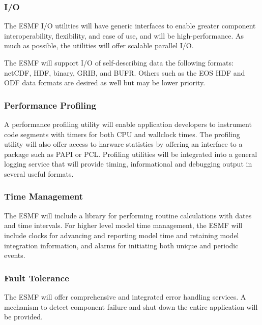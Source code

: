 \subsubsection{I/O}

The ESMF I/O utilities will have generic interfaces to enable greater
component interoperability, flexibility, and ease of use, and will be 
high-performance.  As much as possible, the utilities will offer scalable 
parallel I/O.

The ESMF will support I/O of self-describing data the following formats:
netCDF, HDF, binary, GRIB, and BUFR.  Others such as the EOS HDF and ODF 
data formats are desired as well but may be lower priority.

\subsubsection{Performance Profiling}

A performance profiling utility will enable application developers to 
instrument code segments with timers for both CPU and wallclock 
times.  The profiling utility will also offer access to harware statistics 
by offering an interface to a package such as PAPI or PCL.  Profiling
utilities will be integrated into a general logging service that will 
provide timing, informational and debugging output in several useful formats.

\subsubsection{Time Management}

The ESMF will include a library for performing routine 
calculations with dates and time intervals.  For higher level model
time management, the ESMF will include clocks for advancing and 
reporting model time and retaining model integration information, 
and alarms for initiating both unique and periodic events.

\subsubsection{Fault Tolerance}

The ESMF will offer comprehensive and integrated error handling services.  
A mechanism to detect component failure and shut down the entire 
application will be provided.





















